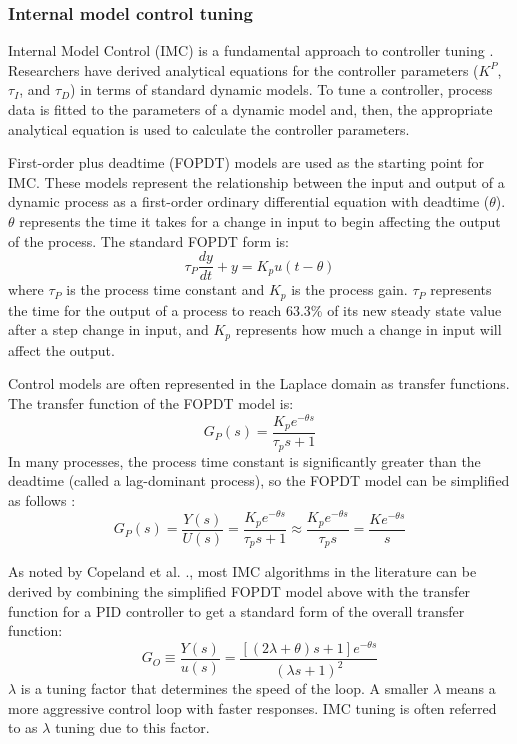 \subsubsection{Internal model control tuning}
Internal Model Control (IMC) is a fundamental approach to controller tuning \cite{Skogestad2003}. Researchers have derived analytical equations for the controller parameters ($K^P$, $\tau_I$, and $\tau_D$) in terms of standard dynamic models. To tune a controller, process data is  fitted to the parameters of a dynamic model and, then, the appropriate analytical equation is used to calculate the controller parameters.

First-order plus deadtime (FOPDT) models are used as the starting point for IMC. These models represent the relationship between the input and output of a dynamic process as a first-order ordinary differential equation with deadtime ($\theta$). $\theta$ represents the time it takes for a change in input to begin affecting the output of the process. The standard FOPDT form is:
\begin{equation}
    \tau_P \frac{dy}{dt} + y = K_p u(t-\theta)
\end{equation}
where $\tau_P$ is the process time constant and $K_p$ is the process gain. $\tau_P$ represents the time for the output of a process to reach 63.3\% of its new steady state value after a step change in input, and $K_p$ represents how much a change in input will affect the output.  

Control models are often represented in the Laplace domain as transfer functions. The transfer function of the FOPDT model is:
\begin{equation}
    G_P(s) = \frac{K_p e^{-\theta s}}{\tau_p s +1}
\end{equation}
In many processes, the process time constant is significantly greater than the deadtime (called a lag-dominant process), so the FOPDT model can be simplified as follows \cite{Copeland2010}:
\begin{equation}
    G_P(s) = \frac{Y(s)}{U(s)} = \frac{K_p e^{-\theta s}}{\tau_p s +1} \approx \frac{K_p e^{-\theta s}}{\tau_p s } = \frac{K e^{-\theta s}}{s}
\end{equation}

As noted by Copeland et al. \cite{Copeland2010}., most IMC algorithms in the literature can be derived by combining the simplified FOPDT model above with the transfer function for a PID controller to get a standard form of the overall transfer function:
\begin{equation}
    G_O \equiv \frac{Y(s)}{u(s)} = \frac{[(2\lambda + \theta)s+1]e^{-\theta s}}{(\lambda s+1)^2}
\end{equation}
$\lambda$ is a tuning factor that determines the speed of the loop. A smaller $\lambda$ means a more aggressive control loop with faster responses. IMC tuning is often referred to as $\lambda$ tuning due to this factor. 

